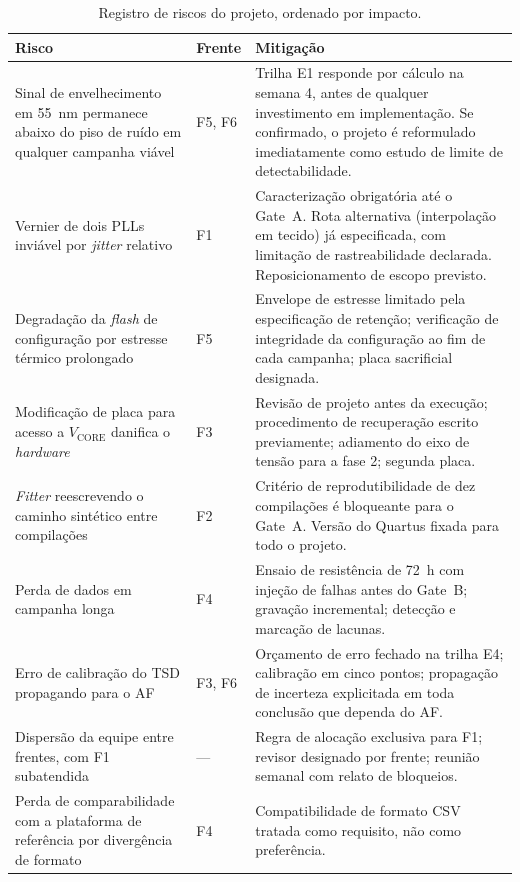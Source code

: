 \documentclass[11pt,a4paper]{article}
\begin{document}
\begin{table}[htbp]
\centering
\caption{Registro de riscos do projeto, ordenado por impacto.}
\label{tab:riscos}
\small
\begin{tabularx}{\textwidth}{@{}L{4.0cm} C{1.3cm} X@{}}
\toprule
\textbf{Risco} & \textbf{Frente} & \textbf{Mitigação} \\
\midrule
Sinal de envelhecimento em \SI{55}{\nano\meter} permanece abaixo do piso de ruído em qualquer campanha viável &
F5, F6 &
Trilha E1 responde por cálculo na semana 4, antes de qualquer investimento em implementação. Se confirmado, o projeto é reformulado imediatamente como estudo de limite de detectabilidade. \\
Vernier de dois PLLs inviável por \emph{jitter} relativo &
F1 &
Caracterização obrigatória até o Gate~A. Rota alternativa (interpolação em tecido) já especificada, com limitação de rastreabilidade declarada. Reposicionamento de escopo previsto. \\
Degradação da \emph{flash} de configuração por estresse térmico prolongado &
F5 &
Envelope de estresse limitado pela especificação de retenção; verificação de integridade da configuração ao fim de cada campanha; placa sacrificial designada. \\
Modificação de placa para acesso a $V_\text{CORE}$ danifica o \emph{hardware} &
F3 &
Revisão de projeto antes da execução; procedimento de recuperação escrito previamente; adiamento do eixo de tensão para a fase 2; segunda placa. \\
\emph{Fitter} reescrevendo o caminho sintético entre compilações &
F2 &
Critério de reprodutibilidade de dez compilações é bloqueante para o Gate~A. Versão do Quartus fixada para todo o projeto. \\
Perda de dados em campanha longa &
F4 &
Ensaio de resistência de \SI{72}{\hour} com injeção de falhas antes do Gate~B; gravação incremental; detecção e marcação de lacunas. \\
Erro de calibração do TSD propagando para o AF &
F3, F6 &
Orçamento de erro fechado na trilha E4; calibração em cinco pontos; propagação de incerteza explicitada em toda conclusão que dependa do AF. \\
Dispersão da equipe entre frentes, com F1 subatendida &
--- &
Regra de alocação exclusiva para F1; revisor designado por frente; reunião semanal com relato de bloqueios. \\
Perda de comparabilidade com a plataforma de referência por divergência de formato &
F4 &
Compatibilidade de formato CSV tratada como requisito, não como preferência. \\
\bottomrule
\end{tabularx}
\end{table}
\end{document}
